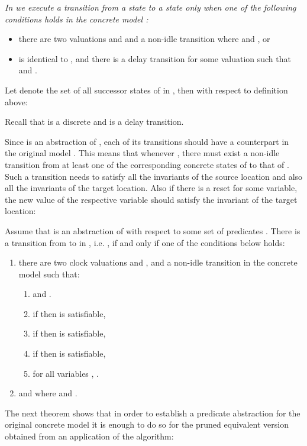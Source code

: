 \documentclass{eptcs}
\begin{document}
\begin{definition}[Transitions of ]{\em
In  we execute a transition from a state  to a state
 only when one of the following conditions holds in the concrete
model :
\begin{itemize}
\item there are two valuations  and  and a non-idle transition  where  and
, or
\item  is identical to , and there is a delay transition  for some valuation  such
that  and .
\end{itemize}}
\end{definition}

\noindent
Let  denote the set of all successor states of  in
, then with respect to definition above:

Recall that  is a discrete and  is a delay transition.

Since  is an abstraction of , each of its transitions should 
have a counterpart in the original model . This means that whenever 
, there must exist a non-idle transition from
at least one of the corresponding concrete states of  to that of . 
Such a transition needs to satisfy all the invariants of the source location and also
all the invariants of the target location. Also if there is a reset for some variable, the new
value of the respective variable should satisfy the invariant of the target location:

\begin{lemma}
\label{lem.trans}
Assume that  is an abstraction of  with respect to some set of
predicates .  There is a transition from  to  in
, i.e. , if and only if 
one of the conditions below holds:
\begin{enumerate}
\item there are two clock valuations  and , and a non-idle transition 
 in the concrete model such that:
  \begin{enumerate}
   \item  and .
   \item if  then  is satisfiable, 
   \item if  then  is satisfiable, 
   \item if  then  is satisfiable, 
   \item for all variables , .
  \end{enumerate}
\item  and  where
   and .
\end{enumerate}
\end{lemma} 
The next theorem shows that in order to establish a predicate abstraction for the
original concrete model  it is enough to do so for the pruned
equivalent version obtained from an application of the  algorithm:
\end{document}
